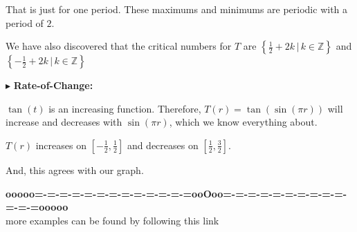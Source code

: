 \documentclass{ximera}
\begin{document}
That is just for one period. These maximums and minimums are periodic with a period of $2$.


We have also discovered that the critical numbers for $T$ are $\left\{ \frac{1}{2} + 2k \, | \, k \in \mathbb{Z} \right\}$ and $\left\{ -\frac{1}{2} + 2k \, | \, k \in \mathbb{Z} \right\}$



$\blacktriangleright$ \textbf{\textcolor{blue!55!black}{Rate-of-Change: }} 


$\tan(t)$ is an increasing function.  Therefore, $T(r) = \tan(\sin(\pi r))$ will increase and decreases with $\sin(\pi r)$, which we know everything about.




$T(r)$ increases on $\left[ -\frac{1}{2}, \frac{1}{2} \right]$ and decreases on $\left[\frac{1}{2}, \frac{3}{2} \right]$.



And, this agrees with our graph.








\begin{center}
\textbf{\textcolor{green!50!black}{ooooo=-=-=-=-=-=-=-=-=-=-=-=-=ooOoo=-=-=-=-=-=-=-=-=-=-=-=-=ooooo}} \\

more examples can be found by following this link\\ 

\end{center}
\end{document}
